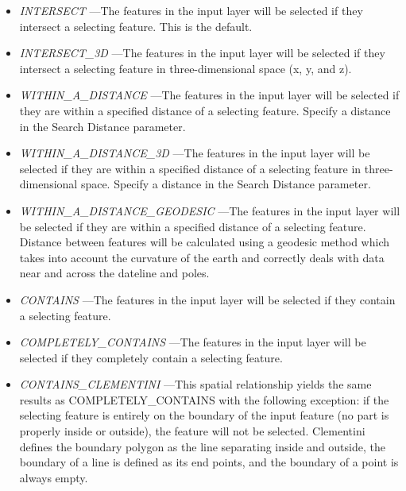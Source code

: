 \documentclass[openany]{book}
\providecommand{\tightlist}{%
  \setlength{\itemsep}{0pt}\setlength{\parskip}{0pt}}
\theoremstyle{definition}
\theoremstyle{definition}
\theoremstyle{definition}
\theoremstyle{remark}
\begin{document}
\begin{enumerate}
  \begin{itemize}
  \tightlist
  \item
    \emph{INTERSECT} ---The features in the input layer will be selected
    if they intersect a selecting feature. This is the default.\\
  \item
    \emph{INTERSECT\_3D} ---The features in the input layer will be
    selected if they intersect a selecting feature in three-dimensional
    space (x, y, and z).\\
  \item
    \emph{WITHIN\_A\_DISTANCE} ---The features in the input layer will
    be selected if they are within a specified distance of a selecting
    feature. Specify a distance in the Search Distance parameter.\\
  \item
    \emph{WITHIN\_A\_DISTANCE\_3D} ---The features in the input layer
    will be selected if they are within a specified distance of a
    selecting feature in three-dimensional space. Specify a distance in
    the Search Distance parameter.\\
  \item
    \emph{WITHIN\_A\_DISTANCE\_GEODESIC} ---The features in the input
    layer will be selected if they are within a specified distance of a
    selecting feature. Distance between features will be calculated
    using a geodesic method which takes into account the curvature of
    the earth and correctly deals with data near and across the dateline
    and poles.\\
  \item
    \emph{CONTAINS} ---The features in the input layer will be selected
    if they contain a selecting feature.\\
  \item
    \emph{COMPLETELY\_CONTAINS} ---The features in the input layer will
    be selected if they completely contain a selecting feature.\\
  \item
    \emph{CONTAINS\_CLEMENTINI} ---This spatial relationship yields the
    same results as COMPLETELY\_CONTAINS with the following exception:
    if the selecting feature is entirely on the boundary of the input
    feature (no part is properly inside or outside), the feature will
    not be selected. Clementini defines the boundary polygon as the line
    separating inside and outside, the boundary of a line is defined as
    its end points, and the boundary of a point is always empty.\\

\end{itemize}
\end{enumerate}
\end{document}
